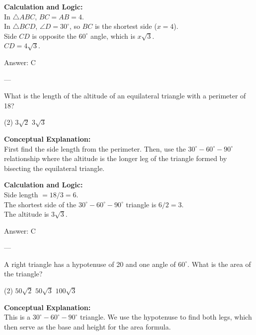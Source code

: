 \documentclass[11pt,paper=a4,answers]{exam}
\begin{document}
\begin{questions}
\begin{solution}
\vspace{10pt}
\textbf{Calculation and Logic:} \\
In $\triangle ABC$, $BC = AB = 4$. \\
In $\triangle BCD$, $\angle D = 30^\circ$, so $BC$ is the shortest side ($x = 4$). \\
Side $CD$ is opposite the $60^\circ$ angle, which is $x\sqrt{3}$. \\
$CD = 4\sqrt{3}$.

\vspace{15pt}
Answer: \colorbox{yellow!100}{C}
\end{solution}

---

\question
What is the length of the altitude of an equilateral triangle with a perimeter of 18?
\begin{tasks}(2)
    \task $3\sqrt{2}$
    \task $3\sqrt{3}$
\end{tasks}

\begin{solution}
\textbf{Conceptual Explanation:} \\
First find the side length from the perimeter. Then, use the $30^\circ-60^\circ-90^\circ$ relationship where the altitude is the longer leg of the triangle formed by bisecting the equilateral triangle.

\vspace{10pt}
\textbf{Calculation and Logic:} \\
Side length $= 18 / 3 = 6$. \\
The shortest side of the $30^\circ-60^\circ-90^\circ$ triangle is $6 / 2 = 3$. \\
The altitude is $3\sqrt{3}$.

\vspace{15pt}
Answer: \colorbox{yellow!100}{C}
\end{solution}

---

\question
A right triangle has a hypotenuse of 20 and one angle of $60^\circ$. What is the area of the triangle?
\begin{tasks}(2)
    \task $50\sqrt{2}$
    \task $50\sqrt{3}$
    \task $100\sqrt{3}$
\end{tasks}

\begin{solution}
\textbf{Conceptual Explanation:} \\
This is a $30^\circ-60^\circ-90^\circ$ triangle. We use the hypotenuse to find both legs, which then serve as the base and height for the area formula.


\end{solution}
\end{questions}
\end{document}
